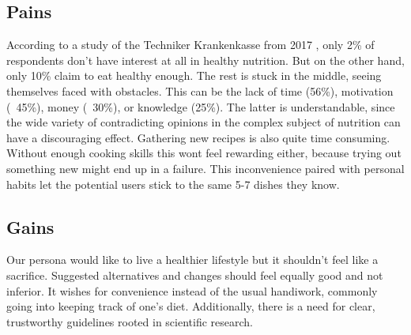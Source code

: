 \subsection*{Pains}
According to a study of the Techniker Krankenkasse from 2017 \autocite{TK}, only 2\% of respondents don't have interest at all in healthy nutrition. But on the other hand, only 10\% claim to eat healthy enough. The rest is stuck in the middle, seeing themselves faced with obstacles. This can be the lack of time (56\%), motivation (~45\%), money (~30\%), or knowledge (25\%). The latter is understandable, since the wide variety of contradicting opinions in the complex subject of nutrition can have a discouraging effect. Gathering new recipes is also quite time consuming. Without enough cooking skills this wont feel rewarding either, because trying out something new might end up in a failure. This inconvenience paired with personal habits let the potential users stick to the same 5-7 dishes they know.

\subsection*{Gains}
Our persona would like to live a healthier lifestyle but it shouldn’t feel like a sacrifice. Suggested alternatives and changes should feel equally good and not inferior. It wishes for convenience instead of the usual handiwork, commonly going into keeping track of one's diet. Additionally, there is a need for clear, trustworthy guidelines rooted in scientific research.
